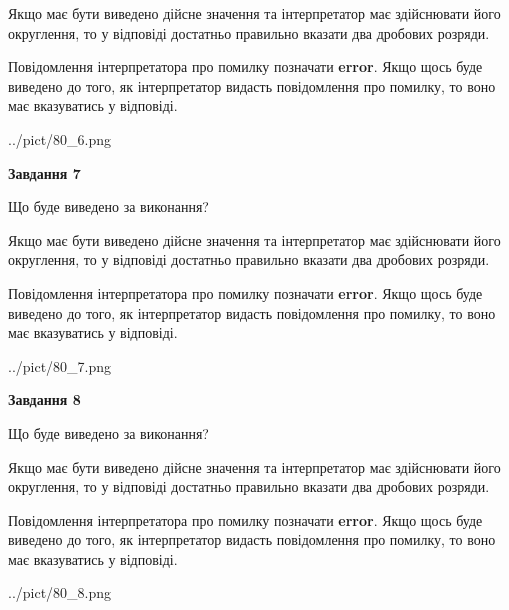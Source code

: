 \documentclass[12pt, ukrainian]{article}
\begin{document}
{\begin {Large}
Якщо має бути виведено дійсне значення та інтерпретатор має здійснювати його округлення, 
то у відповіді достатньо правильно вказати два дробових розряди.

Повідомлення інтерпретатора про помилку позначати \textbf{error}.
Якщо щось буде виведено до того, як інтерпретатор видасть повідомлення про помилку, 
то воно має вказуватись у відповіді. \par

\begin{center}
	{../pict/80_6.png}
\end{center}
\newpage

{\begin {center}\textbf{Завдання 7}\end {center}}\par
Що буде виведено за виконання? \par

Якщо має бути виведено дійсне значення та інтерпретатор має здійснювати його округлення, 
то у відповіді достатньо правильно вказати два дробових розряди.

Повідомлення інтерпретатора про помилку позначати \textbf{error}.
Якщо щось буде виведено до того, як інтерпретатор видасть повідомлення про помилку, 
то воно має вказуватись у відповіді. \par

\begin{center}
	{../pict/80_7.png}
\end{center}
\newpage

{\begin {center}\textbf{Завдання 8}\end {center}}\par
Що буде виведено за виконання? \par

Якщо має бути виведено дійсне значення та інтерпретатор має здійснювати його округлення, 
то у відповіді достатньо правильно вказати два дробових розряди.

Повідомлення інтерпретатора про помилку позначати \textbf{error}.
Якщо щось буде виведено до того, як інтерпретатор видасть повідомлення про помилку, 
то воно має вказуватись у відповіді. \par

\begin{center}
	{../pict/80_8.png}
\end{center}
\newpage


\end{Large}}
\end{document}
